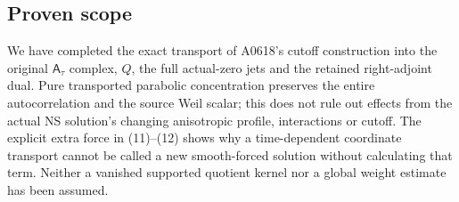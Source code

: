 \subsection{Proven scope}\label{proof09:proven-scope}

We have completed the exact transport of A0618's cutoff construction
into the original \(\mathsf A_\tau\) complex, \(Q\), the full
actual-zero jets and the retained right-adjoint dual. Pure transported
parabolic concentration preserves the entire autocorrelation and the
source Weil scalar; this does not rule out effects from the actual NS
solution's changing anisotropic profile, interactions or cutoff. The
explicit extra force in (11)--(12) shows why a time-dependent coordinate
transport cannot be called a new smooth-forced solution without
calculating that term. Neither a vanished supported quotient kernel nor
a global weight estimate has been assumed.
